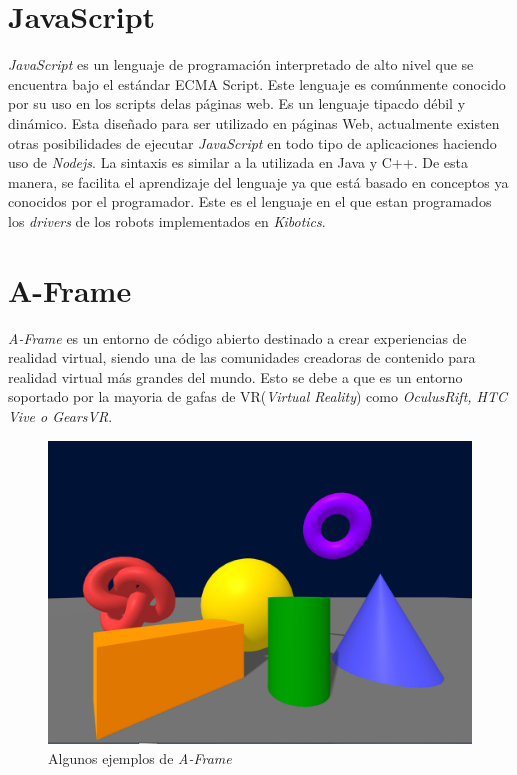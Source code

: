 \section{JavaScript}
\label{sec:js}
\textit{JavaScript} es un lenguaje de programación interpretado de alto nivel que se encuentra bajo el estándar ECMA Script. Este lenguaje es comúnmente conocido por su uso en los scripts delas páginas web. Es un lenguaje tipacdo débil y dinámico. Esta diseñado para ser utilizado en páginas Web, actualmente existen otras posibilidades de ejecutar \textit{JavaScript} en todo tipo de aplicaciones haciendo uso de \textit{Nodejs}.\newline
La sintaxis es similar a la utilizada en Java y C++. De esta manera, se facilita el aprendizaje del lenguaje ya que está basado en conceptos ya conocidos por el programador.\newline
Este es el lenguaje en el que estan programados los \textit{drivers} de los robots implementados en \textit{Kibotics}. 
\section{A-Frame}
\label{sec:aframe}
\textit{A-Frame} es un entorno de código abierto destinado a crear experiencias de realidad virtual, siendo una de las comunidades creadoras de contenido para realidad virtual más grandes del mundo. Esto se debe a que es un entorno soportado por la mayoria de gafas de VR(\textit{Virtual Reality}) como \textit{OculusRift, HTC Vive o GearsVR}.\newline
\begin{figure}[ht]
    \centering
    \includegraphics[width=1\textwidth]{img/Aframe.png}
    \caption{Algunos ejemplos de \textit{A-Frame}} 
    \label{fig:A-Frame}
\end{figure}

